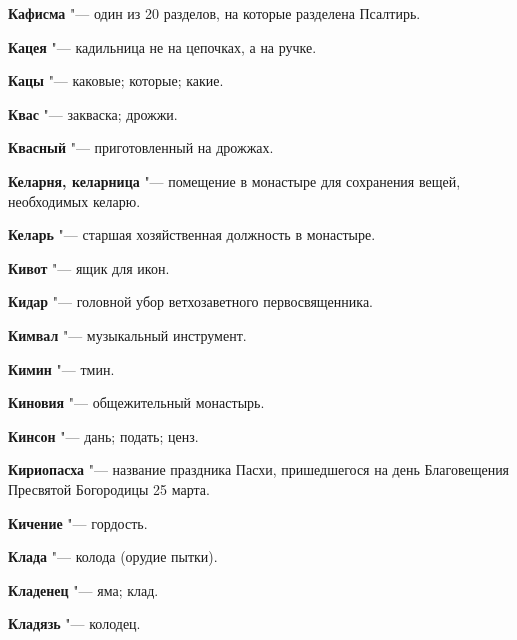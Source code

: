 \begin{mymulticols}{2}
\noindent\textbf{Кафисма} "--- один из 20 разделов, на которые разделена Псалтирь. 




\noindent\textbf{Кацея} "--- кадильница не на цепочках, а на ручке. 




\noindent\textbf{Кацы} "--- каковые; которые; какие. 




\noindent\textbf{Квас} "--- закваска; дрожжи. 




\noindent\textbf{Квасный} "--- приготовленный на дрожжах. 




\noindent\textbf{Келарня, келарница} "--- помещение в монастыре для сохранения вещей, необходимых келарю. 




\noindent\textbf{Келарь} "--- старшая хозяйственная должность в монастыре. 




\noindent\textbf{Кивот} "--- ящик для икон. 




\noindent\textbf{Кидар} "--- головной убор ветхозаветного первосвященника. 




\noindent\textbf{Кимвал} "--- музыкальный инструмент. 




\noindent\textbf{Кимин} "--- тмин. 




\noindent\textbf{Киновия} "--- общежительный монастырь. 




\noindent\textbf{Кинсон} "--- дань; подать; ценз. 




\noindent\textbf{Кириопасха} "--- название праздника Пасхи, пришедшегося на день Благовещения Пресвятой Богородицы 25 марта. 




\noindent\textbf{Кичение} "--- гордость. 




\noindent\textbf{Клада} "--- колода (орудие пытки). 




\noindent\textbf{Кладенец} "--- яма; клад. 




\noindent\textbf{Кладязь} "--- колодец. 





\end{mymulticols}
